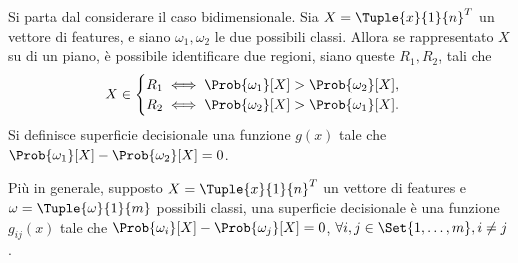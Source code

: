 \documentclass{subfiles}
\begin{document}
Si parta dal considerare il caso bidimensionale.
Sia \(X = \Tuple{x}{1}{n}^{T}\) un vettore di features, e siano \(\omega_{1}, \omega_{2}\) le due possibili classi.
Allora se rappresentato \(X\) su di un piano, è possibile identificare due regioni, siano queste \(R_{1}, R_{2}\), tali che
\[X \in \begin{cases}
        R_{1} \iff \Prob{\omega_{1}}[X] > \Prob{\omega_{2}}[X], \\
        R_{2} \iff \Prob{\omega_{2}}[X] > \Prob{\omega_{1}}[X].
    \end{cases}\]
Si definisce superficie decisionale una funzione \(g(x)\) tale che \(\Prob{\omega_{1}}[X] - \Prob{\omega_{2}}[X] = 0\).

Più in generale, supposto \(X = \Tuple{x}{1}{n}^{T}\) un vettore di features e \(\omega = \Tuple{\omega}{1}{m}\) possibili classi,
una superficie decisionale è una funzione \(g_{ij}(x)\) tale che \(\Prob{\omega_{i}}[X] - \Prob{\omega_{j}}[X] = 0\), \(\forall i, j \in \Set{1, \ldots, m}, i \ne j\).
\end{document}
